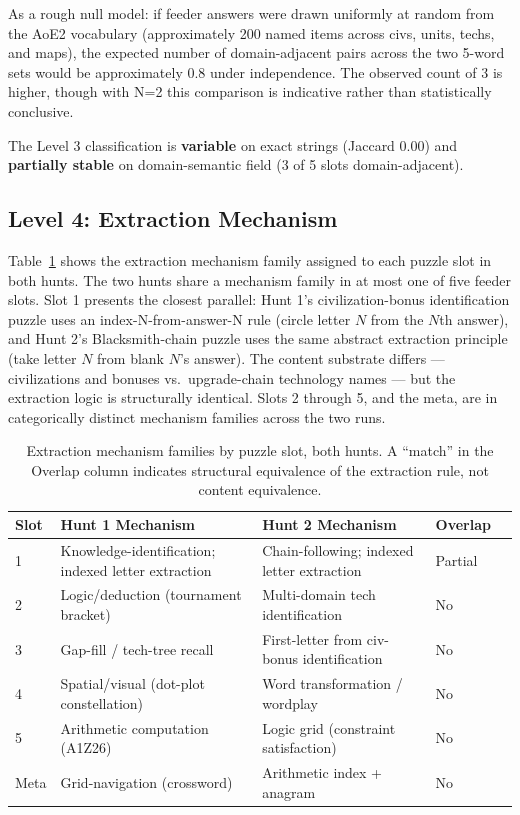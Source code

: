 As a rough null model: if feeder answers were drawn uniformly at random from the AoE2 vocabulary (approximately 200 named items across civs, units, techs, and maps), the expected number of domain-adjacent pairs across the two 5-word sets would be approximately 0.8 under independence. The observed count of 3 is higher, though with N=2 this comparison is indicative rather than statistically conclusive.

The Level 3 classification is \textbf{variable} on exact strings (Jaccard 0.00) and \textbf{partially stable} on domain-semantic field (3 of 5 slots domain-adjacent).

\subsection{Level 4: Extraction Mechanism}
\label{sec:results-mechanism}

Table~\ref{tab:mechanism-comparison} shows the extraction mechanism family assigned to each puzzle slot in both hunts. The two hunts share a mechanism family in at most one of five feeder slots. Slot 1 presents the closest parallel: Hunt 1's civilization-bonus identification puzzle uses an index-N-from-answer-N rule (circle letter $N$ from the $N$th answer), and Hunt 2's Blacksmith-chain puzzle uses the same abstract extraction principle (take letter $N$ from blank $N$'s answer). The content substrate differs --- civilizations and bonuses vs.\ upgrade-chain technology names --- but the extraction logic is structurally identical. Slots 2 through 5, and the meta, are in categorically distinct mechanism families across the two runs.

\begin{table}[h]
\centering
\caption{Extraction mechanism families by puzzle slot, both hunts. A ``match'' in the Overlap column indicates structural equivalence of the extraction rule, not content equivalence.}
\label{tab:mechanism-comparison}
\small
\begin{tabular}{llllc}
\toprule
\textbf{Slot} & \textbf{Hunt 1 Mechanism} & \textbf{Hunt 2 Mechanism} & \textbf{Overlap} \\
\midrule
1 & Knowledge-identification; indexed letter extraction & Chain-following; indexed letter extraction & Partial \\
2 & Logic/deduction (tournament bracket) & Multi-domain tech identification & No \\
3 & Gap-fill / tech-tree recall & First-letter from civ-bonus identification & No \\
4 & Spatial/visual (dot-plot constellation) & Word transformation / wordplay & No \\
5 & Arithmetic computation (A1Z26) & Logic grid (constraint satisfaction) & No \\
Meta & Grid-navigation (crossword) & Arithmetic index + anagram & No \\
\bottomrule
\end{tabular}
\end{table}


